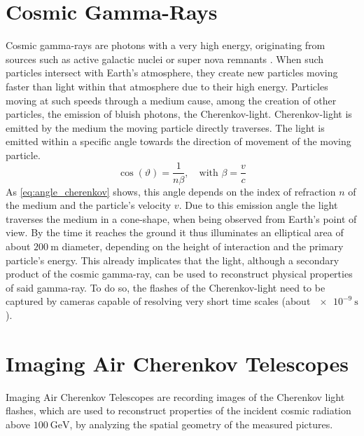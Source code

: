 \section{Cosmic Gamma-Rays}
%
Cosmic gamma-rays are photons with a very high energy, originating from sources such as active galactic nuclei or super nova remnants \cite{FACT-Design}. When such particles intersect
with Earth's atmosphere, they create new particles moving faster than light
within that atmosphere due to their high energy. Particles moving at such
speeds through a medium cause, among the creation of other particles, the
emission of bluish photons, the Cherenkov-light.
Cherenkov-light is emitted by the medium the moving particle directly traverses.
The light is emitted within a specific angle towards the direction of movement of the moving particle.
%
\begin{equation}
    \cos(\vartheta) = \frac{1}{n\beta}, \quad \text{with } \beta=\frac{v}{c}
    \label{eq:angle_cherenkov}
\end{equation}
%
As \autoref{eq:angle_cherenkov} shows, this angle depends on the index of
refraction $n$ of the medium and the particle's velocity $v$. Due to this emission
angle the light traverses the medium in a cone-shape, when being observed from
Earth's point of view. By the time it reaches the ground it thus
illuminates an elliptical area of about $\SI{200}{\meter}$ diameter, depending
on the height of interaction and the primary particle's energy.
This already implicates that the light, although a secondary product of the
cosmic gamma-ray, can be used to reconstruct physical properties of
said gamma-ray. To do so, the flashes of the Cherenkov-light need to
be captured by cameras capable of resolving very short time scales (about
$\SI{e-9}{\second}$).

\section{Imaging Air Cherenkov Telescopes}

Imaging Air Cherenkov Telescopes are recording images of the Cherenkov light flashes, which are used to
reconstruct properties of the incident cosmic radiation above
$\SI{100}{\giga\electronvolt}$, by analyzing the spatial geometry of the
measured pictures.

